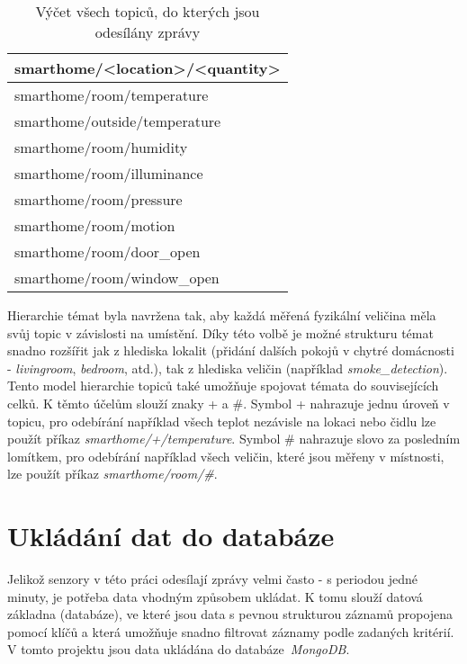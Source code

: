 \begin{table}[h]
\centering
 \begin{tabular}{|p{6cm}|} 
 \hline
  smarthome/<location>/<quantity>  \\
 \hline\hline
 smarthome/room/temperature \\ 
 smarthome/outside/temperature \\
 smarthome/room/humidity \\
 smarthome/room/illuminance \\
 smarthome/room/pressure \\
 smarthome/room/motion \\
 smarthome/room/door\_open \\
 smarthome/room/window\_open \\
 \hline
 \end{tabular}
 \caption{Výčet všech topiců, do kterých jsou odesílány zprávy}
 \label{tab:mqtt_topic_structure}
\end{table}

Hierarchie témat byla navržena tak, aby každá měřená fyzikální veličina měla svůj topic v závislosti na umístění. Díky této volbě je možné strukturu témat snadno rozšířit jak z hlediska lokalit (přidání dalších pokojů v chytré domácnosti - \textit{livingroom}, \textit{bedroom}, atd.), tak z hlediska veličin (například \textit{smoke\_detection}). Tento model hierarchie topiců také umožňuje spojovat témata do souvisejících celků. K těmto účelům slouží znaky + a \#. Symbol + nahrazuje jednu úroveň v topicu, pro odebírání například všech teplot nezávisle na lokaci nebo čidlu lze použít příkaz \textit{smarthome/+/temperature}. Symbol  \# nahrazuje slovo za posledním lomítkem, pro odebírání například všech veličin, které jsou měřeny v místnosti, lze použít příkaz \mbox{\textit{smarthome/room/\#}}. 

\section{Ukládání dat do databáze} \label{sec:database}
Jelikož senzory v této práci odesílají zprávy velmi často - s periodou jedné minuty, je potřeba data vhodným způsobem ukládat. K tomu slouží datová základna (databáze), ve které jsou data s pevnou strukturou záznamů propojena pomocí klíčů a která umožňuje snadno filtrovat záznamy podle zadaných kritérií. V tomto projektu jsou data ukládána do \mbox{databáze \textit{MongoDB}}.


